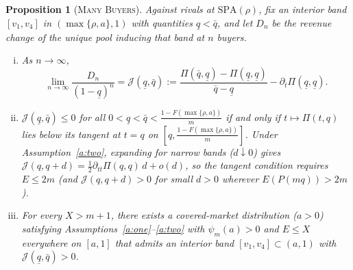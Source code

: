\documentclass[12pt]{article}
\theoremstyle{mystyle}
\newtheorem{proposition}{Proposition}
\theoremstyle{mystyle2}
\newcommand{\SPA}{\mathrm{SPA}}
\newcommand{\1}{\mathbf{1}}
\begin{document}
\begin{proposition}[\textsc{Many Buyers}]\label{prop:manybuyers}
Against rivals at $\SPA(\rho)$, fix an interior band $[v_1,v_4]$ in $(\max\{\rho,a\},1)$ with quantities $\underline q<\bar q$, and let $D_n$ be the revenue change of the unique pool inducing that band at $n$ buyers.
\begin{enumerate}[(i)]
\item As $n\to\infty$,
\begin{equation}\label{eq:Jlim}
\lim_{n\to\infty}\frac{D_n}{(1-\underline q)^n} = \mathcal J(\underline q,\bar q) := \frac{\Pi(\bar q,\underline q)-\Pi(\underline q,\underline q)}{\bar q-\underline q} - \partial_t\Pi(\underline q,\underline q).
\end{equation}
\item $\mathcal J(\underline q,\bar q)\le 0$ for all $0<\underline q<\bar q<\frac{1-F(\max\{\rho,a\})}{m}$ if and only if $t\mapsto\Pi(t,q)$ lies below its tangent at $t=q$ on $[q,\frac{1-F(\max\{\rho,a\})}{m}]$. Under Assumption~\ref{a:two}, expanding for narrow bands ($d\downarrow 0$) gives $\mathcal J(q,q+d)=\frac{1}{2}\partial_{tt}\Pi(q,q)\,d+o(d)$, so the tangent condition requires $E\le 2m$ (and $\mathcal J(q,q+d)>0$ for small $d>0$ wherever $E(P(mq))>2m$).
\item For every $X>m+1$, there exists a covered-market distribution ($a>0$) satisfying Assumptions~\ref{a:one}--\ref{a:two} with $\psi_m(a)>0$ and $E\le X$ everywhere on $[a,1]$ that admits an interior band $[v_1,v_4]\subset(a,1)$ with $\mathcal J(\underline q,\bar q)>0$.
\end{enumerate}
\end{proposition}
\end{document}
